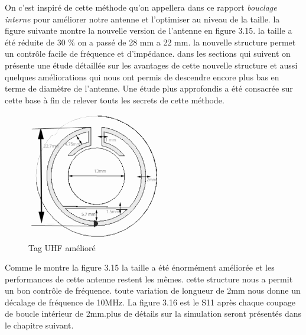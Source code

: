 \documentclass[11pt, a4paper, twoside]{book}
\begin{document}
On c'est inspiré de cette méthode qu'on appellera dans ce rapport \emph{bouclage interne} pour améliorer notre antenne et l'optimiser au niveau de la taille. la figure suivante montre la nouvelle version de l'antenne en figure 3.15. la taille a été réduite de 30 \% on a passé de 28 mm a 22 mm. la nouvelle structure permet un contrôle facile de fréquence et d'impédance. dans les sections qui suivent on présente une étude détaillée sur les avantages de cette nouvelle structure et aussi quelques améliorations qui nous ont permis de descendre encore plus bas en terme de diamètre de l'antenne. Une étude plus approfondis a été consacrée sur cette base à fin de relever touts les secrets de cette méthode.\\

\begin{figure}[H]
\centering
\includegraphics[width=6cm]{1STee}
\caption{Tag UHF amélioré}
\end{figure}
Comme le montre la figure 3.15 la taille a été énormément améliorée et les performances de cette antenne restent les mêmes. cette structure nous a permit un bon contrôle de fréquence. toute variation de longueur de 2mm nous donne un décalage de fréquence de 10MHz. La figure 3.16 est le S11 après chaque coupage de boucle intérieur de 2mm.plus de détails sur la simulation seront présentés dans le chapitre suivant.\\
\end{document}
